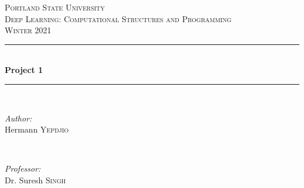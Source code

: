 \documentclass[12pt]{article}
\begin{document}
	
	\begin{titlepage}
		
		\newcommand{\HRule}{\rule{\linewidth}{0.5mm}} %
		
		\center %
		
		
		\textsc{\LARGE Portland State University}\\[1.5cm] %
		\textsc{\Large Deep Learning: Computational Structures and Programming}\\[0.5cm] %
		\textsc{\large Winter 2021}\\[0.5cm] %
		
		
		\HRule \\[0.4cm]
		{ \huge \bfseries Project 1}\\[0.4cm] %
		\HRule \\[1.5cm]
		
		
		\begin{minipage}{0.4\textwidth}
			\begin{flushleft} \large
				\emph{Author:}\\
				Hermann \textsc{Yepdjio} %
			\end{flushleft}
		\end{minipage}
		~
		\begin{minipage}{0.4\textwidth}
			\begin{flushright} \large
				\emph{Professor:} \\
				Dr. Suresh \textsc{Singh} %
			\end{flushright}
		\end{minipage}\\[1cm]
		

\end{titlepage}
\end{document}
